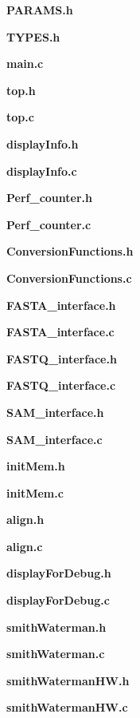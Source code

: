 { %
	
\textbf{PARAMS.h}

\textbf{TYPES.h}

\textbf{main.c}



\textbf{top.h}

\textbf{top.c}

\textbf{displayInfo.h}

\textbf{displayInfo.c}

\textbf{Perf\_counter.h}

\textbf{Perf\_counter.c}



\textbf{ConversionFunctions.h}

\textbf{ConversionFunctions.c}

\textbf{FASTA\_interface.h}

\textbf{FASTA\_interface.c}

\textbf{FASTQ\_interface.h}

\textbf{FASTQ\_interface.c}

\textbf{SAM\_interface.h}

\textbf{SAM\_interface.c}



\textbf{initMem.h}

\textbf{initMem.c}



\textbf{align.h}

\textbf{align.c}

\textbf{displayForDebug.h}

\textbf{displayForDebug.c}

\textbf{smithWaterman.h}

\textbf{smithWaterman.c}

\textbf{smithWatermanHW.h}

\textbf{smithWatermanHW.c}

} %


